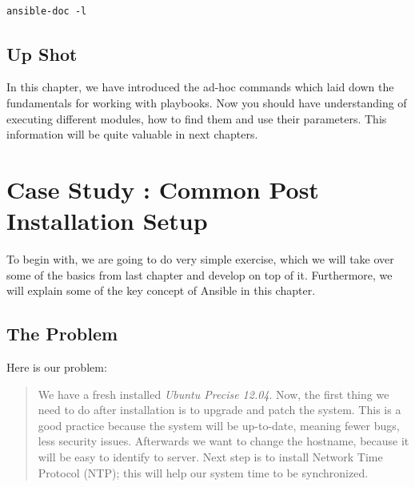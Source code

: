 \documentclass[10pt]{book}
\begin{document}
\begin{Verbatim}

ansible-doc -l

\end{Verbatim}

\section{Up Shot}
In this chapter, we have introduced the ad-hoc commands which laid down the 
fundamentals for working with playbooks. Now you should have understanding of executing different modules, 
how to find them and use their parameters. This information will be quite 
valuable in next chapters.









\chapter{Case Study : Common Post Installation Setup}
\label{chap-common-post-installation-setup}
To begin with, we are going to do very simple exercise, which we will take over some of the basics from 
last chapter and develop on top of it. Furthermore, we will explain some of the key concept of Ansible in 
this chapter.

\section{The Problem}
Here is our problem:

\begin{quote}
 We have a fresh installed \emph{Ubuntu Precise 12.04}. Now, the first thing we need to do after installation 
 is to upgrade and patch the system. This is a good practice because the system will be 
 up-to-date, meaning fewer bugs, less security issues. Afterwards we want to change the 
 hostname, because it will be easy to identify to server. Next step is to install 
 Network Time Protocol (NTP); this will help our system time to be synchronized. 
\end{quote}
\end{document}
